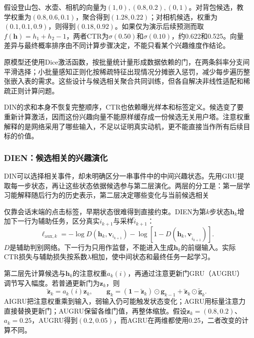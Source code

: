 假设登山包、水壶、相机的向量为$(1,0),(0.8,0.2),(0,1)$。对背包候选，教学权重为$(0.8,0.6,0.1)$，聚合得到$(1.28,0.22)$；对相机候选，权重为$(0.1,0.1,0.9)$，则得到$(0.18,0.92)$。如果仅为演示后续预测而取$f(\bm{h})=h_1+h_2-1$，两者CTR为$\sigma(0.50)$和$\sigma(0.10)$，约0.622和0.525。向量差异与最终概率排序由不同计算步骤决定，不能只看某个兴趣维度作结论。

原模型还使用Dice激活函数，按批量统计量形成数据依赖的门，在两条斜率分支间平滑选择；小批量感知正则化按稀疏特征出现情况分摊嵌入惩罚，减少每步遍历整张嵌入表的需求。这些设计与候选相关聚合共同训练，但各自解决非线性适配和稀疏正则计算问题。

DIN的求和本身不恢复完整顺序，CTR也依赖曝光样本和标签定义。候选变了要重新计算激活，因而这份兴趣向量不能原样缓存成一份候选无关用户塔。注意权重解释的是网络采用了哪些输入，不足以证明真实动机，更不能直接当作所有后续目标的价值。

\subsubsection{DIEN：候选相关的兴趣演化}
\label{sec:rs-dien}

DIN可以选择相关事件，却未明确区分一串事件中的中间兴趣状态。先用GRU提取每一步状态，再让这些状态依据候选参与第二层演化。两层的分工是：第一层学习能解释随后行为的历史表示，第二层决定哪些变化与当前候选相关

仅靠会话末端的点击标签，早期状态很难得到直接约束。DIEN为第$k$步状态$\bm{h}_k$增加下一行为辅助任务，区分真实$i_{k+1}$与采样$\widetilde i_{k+1}$：
\begin{equation}
  \ell_{\mathrm{aux},k}
  =-\log D(\bm{h}_k,\bm{v}_{i_{k+1}})
   -\log[1-D(\bm{h}_k,\bm{v}_{\widetilde i_{k+1}})].
  \label{eq:rs-dien-aux}
\end{equation}
$D$是辅助判别网络。下一行为只用作监督，不能进入生成$\bm{h}_k$的前缀输入。实际CTR损失与辅助损失按系数$\lambda$相加，使中间状态和最终任务一起学习。

第二层先计算候选与$\bm{h}_k$的注意权重$a_k(i)$，再通过注意更新门GRU（AUGRU）调节写入幅度。若普通更新门为$\bm{z}_k$，则
\begin{equation}
  \widetilde{\bm{z}}_k=a_k(i)\bm{z}_k,\qquad
  \bm{g}_k=(\bm{1}-\widetilde{\bm{z}}_k)\odot\bm{g}_{k-1}
               +\widetilde{\bm{z}}_k\odot\widetilde{\bm{g}}_k.
  \label{eq:rs-dien-augru}
\end{equation}
AIGRU把注意权重乘到输入，弱输入仍可能触发状态变化；AGRU用标量注意力直接替换更新门；AUGRU保留各维门值，再整体缩放。假设$\bm{z}_k=(0.8,0.2)$、$a_k=0.25$，AUGRU得到$(0.2,0.05)$，而AGRU在两维都使用0.25，二者改变的计算不同。

